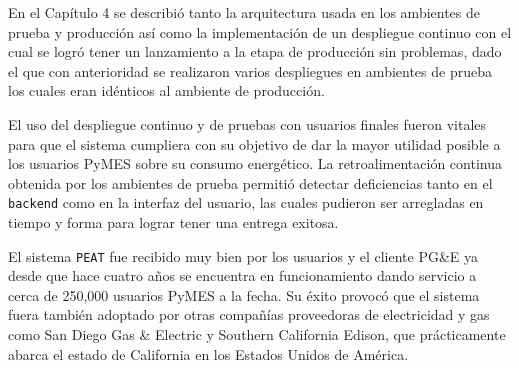 En el Capítulo 4 se describió tanto la arquitectura usada en los ambientes de
prueba y producción así como la implementación de un despliegue continuo con el
cual se logró tener un lanzamiento a la etapa de producción sin problemas, dado el
que con anterioridad se realizaron varios despliegues en ambientes de prueba
los cuales eran idénticos al ambiente de producción.

El uso del despliegue continuo y de pruebas con usuarios finales fueron vitales para
que el sistema cumpliera con su objetivo de dar la mayor utilidad posible
a los usuarios PyMES sobre su consumo energético. La retroalimentación continua
obtenida por los ambientes de prueba permitió detectar deficiencias tanto en el
\texttt{backend} como en la interfaz del usuario, las cuales pudieron ser arregladas
en tiempo y forma para lograr tener una entrega exitosa.

El sistema \texttt{PEAT} fue recibido muy bien por los usuarios y el cliente PG\&E
ya desde que hace cuatro años se encuentra en funcionamiento dando servicio a cerca
de 250,000 usuarios PyMES a la fecha\cite{30_pge_annual_report}. Su éxito provocó que
el sistema fuera también adoptado por otras compañías proveedoras de electricidad y
gas como San Diego Gas \& Electric\cite{32_reuters_c3} y Southern California Edison,
que prácticamente abarca el estado de California en los Estados Unidos de
América\cite{31_energy_map}.
